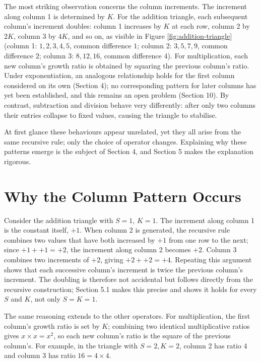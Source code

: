 \documentclass[11pt]{article}
\theoremstyle{definition}
\begin{document}
The most striking observation concerns the column increments. The increment along column 1 is determined by $K$. For the addition triangle, each subsequent column's increment doubles: column 1 increases by $K$ at each row, column 2 by $2K$, column 3 by $4K$, and so on, as visible in Figure \ref{fig:addition-triangle} (column 1: $1,2,3,4,5$, common difference $1$; column 2: $3,5,7,9$, common difference $2$; column 3: $8,12,16$, common difference $4$). For multiplication, each new column's growth ratio is obtained by squaring the previous column's ratio. Under exponentiation, an analogous relationship holds for the first column considered on its own (Section 4); no corresponding pattern for later columns has yet been established, and this remains an open problem (Section 10). By contrast, subtraction and division behave very differently: after only two columns their entries collapse to fixed values, causing the triangle to stabilise.

At first glance these behaviours appear unrelated, yet they all arise from the same recursive rule; only the choice of operator changes. Explaining why these patterns emerge is the subject of Section 4, and Section 5 makes the explanation rigorous.

\section{Why the Column Pattern Occurs}

Consider the addition triangle with $S=1$, $K=1$. The increment along column 1 is the constant itself, $+1$. When column 2 is generated, the recursive rule combines two values that have both increased by $+1$ from one row to the next; since $+1+{+1}={+2}$, the increment along column 2 becomes $+2$. Column 3 combines two increments of $+2$, giving $+2+{+2}={+4}$. Repeating this argument shows that each successive column's increment is twice the previous column's increment. The doubling is therefore not accidental but follows directly from the recursive construction; Section 5.1 makes this precise and shows it holds for every $S$ and $K$, not only $S=K=1$.

The same reasoning extends to the other operators. For multiplication, the first column's growth ratio is set by $K$; combining two identical multiplicative ratios gives $x \times x = x^2$, so each new column's ratio is the square of the previous column's. For example, in the triangle with $S=2,K=2$, column 2 has ratio $4$ and column 3 has ratio $16 = 4\times4$.
\end{document}
